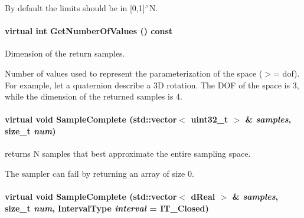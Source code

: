 By default the limits should be in \mbox{[}0,1\mbox{]}$^\wedge$N. \hypertarget{classOpenRAVE_1_1SpaceSamplerBase_a1c2746b270bee7389df0b315a18a719c}{
\paragraph[{GetNumberOfValues}]{\setlength{\rightskip}{0pt plus 5cm}virtual int GetNumberOfValues () const}\hfill}
\label{classOpenRAVE_1_1SpaceSamplerBase_a1c2746b270bee7389df0b315a18a719c}


Dimension of the return samples. 

Number of values used to represent the parameterization of the space ($>$= dof). For example, let a quaternion describe a 3D rotation. The DOF of the space is 3, while the dimension of the returned samples is 4. \hypertarget{classOpenRAVE_1_1SpaceSamplerBase_a996ca169f30d50c4b58f7dd249d312c9}{
\paragraph[{SampleComplete}]{\setlength{\rightskip}{0pt plus 5cm}virtual void SampleComplete (std::vector$<$ uint32\_\-t $>$ \& {\em samples}, \/  size\_\-t {\em num})}\hfill}
\label{classOpenRAVE_1_1SpaceSamplerBase_a996ca169f30d50c4b58f7dd249d312c9}


returns N samples that best approximate the entire sampling space. 

The sampler can fail by returning an array of size 0. \hypertarget{classOpenRAVE_1_1SpaceSamplerBase_a090abc1c115a60100fc8ed5c85a5ebc2}{
\paragraph[{SampleComplete}]{\setlength{\rightskip}{0pt plus 5cm}virtual void SampleComplete (std::vector$<$ dReal $>$ \& {\em samples}, \/  size\_\-t {\em num}, \/  {\bf IntervalType} {\em interval} = {\ttfamily IT\_\-Closed})}\hfill}
\label{classOpenRAVE_1_1SpaceSamplerBase_a090abc1c115a60100fc8ed5c85a5ebc2}


